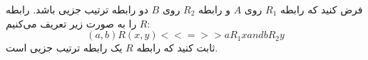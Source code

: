\EXERCISE
فرض کنید که رابطه
$R_1$
روی
$A$
و رابطه
$R_2$
روی
$B$
دو رابطه ترتیب جزیی باشد. رابطه
$R$
را به صورت زیر تعریف می‌کنیم:
$$(a, b)R(x, y) <<=>> aR_1x and bR_2y$$
ثابت کنید که رابطه
$R$
یک رابطه ترتیب جزیی است.